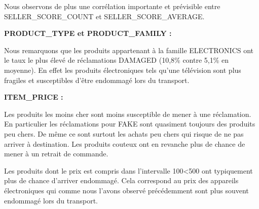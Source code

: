 Nous observons de plus une corrélation importante et prévisible entre SELLER_SCORE_COUNT et 
SELLER_SCORE_AVERAGE.

\textbf{PRODUCT_TYPE et PRODUCT_FAMILY :}

Nous remarquons que les produits appartenant à la famille ELECTRONICS ont le taux le plus 
élevé de réclamations DAMAGED (10,8\% contre 5,1\% en moyenne). En effet les produits
électroniques tels qu'une télévision sont plus fragiles et susceptibles d'être 
endommagé lors du transport.


\textbf{ITEM_PRICE :}

Les produits les moins cher sont moins susceptible de mener à une réclamation.
En particulier les réclamations pour FAKE sont quasiment toujours des produits peu chers.
De même ce sont surtout les achats peu chers qui risque de ne pas arriver à destination.
Les produits couteux ont en revanche plus de chance de mener à un retrait de commande.

Les produits dont le prix est compris dans l'intervalle 100<500 ont typiquement plus de
chance d'arriver endommagé. Cela correspond au prix des appareils électroniques qui comme
nous l'avons observé précédemment sont plus souvent endommagé lors du transport.



























